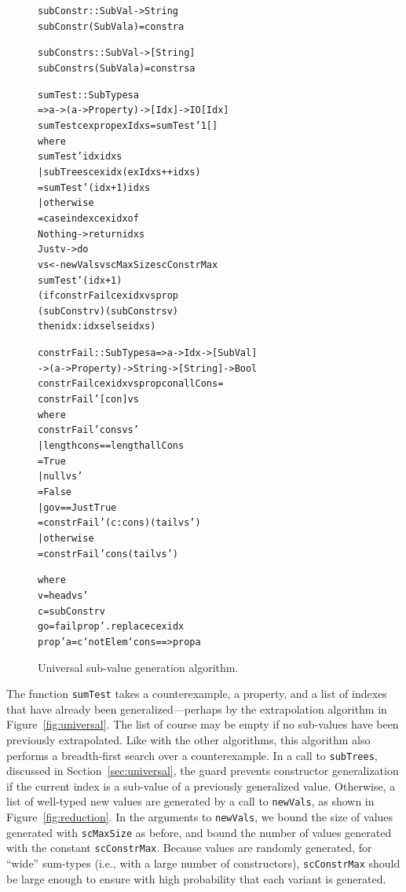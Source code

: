 \documentclass[10pt]{sigplanconf}
\newenvironment{code}{\begin{alltt}}{\end{alltt}}
\newcommand{\ttp}[1]{\texttt{#1}}
\begin{document}
\begin{figure}
  \begin{code}
subConstr :: SubVal -> String
subConstr (SubVal a) = constr a

subConstrs :: SubVal -> [String]
subConstrs (SubVal a) = constrs a

sumTest :: SubTypes a
          => a -> (a -> Property) -> [Idx] -> IO [Idx]
sumTest cex prop exIdxs = sumTest' 1 []
  where
  sumTest' idx idxs
    | subTrees cex idx (exIdxs ++ idxs)
    = sumTest' (idx+1) idxs
    | otherwise
    = case index cex idx of
        Nothing -> return idxs
        Just v  -> do
          vs <- newVals v scMaxSize scConstrMax
          sumTest' (idx+1)
            (if constrFail cex idx vs prop
                  (subConstr v) (subConstrs v)
               then idx:idxs else idxs)

constrFail :: SubTypes a => a -> Idx -> [SubVal]
  -> (a -> Property) -> String -> [String] -> Bool
constrFail cex idx vs prop con allCons =
  constrFail' [con] vs
  where
  constrFail' cons vs'
    | length cons == length allCons
    = True
    | null vs'
    = False
    | go v == Just True
    = constrFail' (c:cons) (tail vs')
    | otherwise
    = constrFail' cons (tail vs')

    where
    v  = head vs'
    c  = subConstr v
    go = fail prop' . replace cex idx
    prop' a = c `notElem` cons ==> prop a
  \end{code}
  \caption{Universal sub-value generation algorithm.}
  \label{fig:constrs}
\end{figure}

The function \ttp{sumTest} takes a counterexample, a property, and a list of
indexes that have already been generalized---perhaps by the extrapolation
algorithm in Figure~\ref{fig:universal}.  The list of course may be empty if no
sub-values have been previously extrapolated.  Like with the other algorithms,
this algorithm also performs a breadth-first search over a counterexample.  In a
call to \ttp{subTrees}, discussed in Section~\ref{sec:universal}, the guard
prevents constructor generalization if the current index is a sub-value of a
previously generalized value.  Otherwise, a list of well-typed new values are
generated by a call to \ttp{newVals}, as shown in Figure~\ref{fig:reduction}.
In the arguments to \ttp{newVals}, we bound the size of values generated with
\ttp{scMaxSize} as before, and bound the number of values generated with the
constant \ttp{scConstrMax}.  Because values are randomly generated, for ``wide''
sum-types (i.e., with a large number of constructors), \ttp{scConstrMax} should
be large enough to ensure with high probability that each variant is generated.
\end{document}
